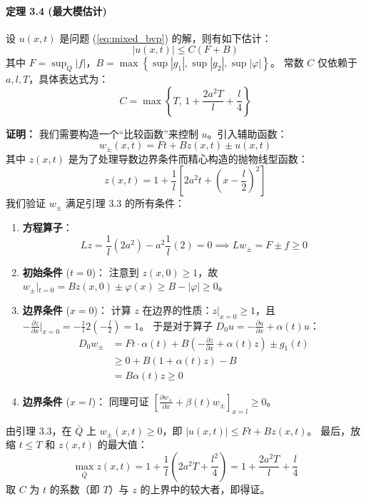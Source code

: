 \documentclass[12pt,a4paper]{ctexart}
\begin{document}
	\paragraph{定理 3.4 (最大模估计)}
	设 $u(x,t)$ 是问题 (\ref{eq:mixed_bvp}) 的解，则有如下估计：
	\begin{equation}
		|u(x,t)| \leqslant C(F + B)
	\end{equation}
	其中 $F = \sup_Q |f|$，$B = \max \left\{ \sup|g_1|, \sup|g_2|, \sup|\varphi| \right\}$。
	常数 $C$ 仅依赖于 $a, l, T$，具体表达式为：
	\[
	C = \max \left\{ T, \, 1 + \frac{2a^2 T}{l} + \frac{l}{4} \right\}
	\]
	
	\textbf{证明：}
	我们需要构造一个“比较函数”来控制 $u$。引入辅助函数：
	\[
	w_{\pm}(x,t) = F t + B z(x,t) \pm u(x,t)
	\]
	其中 $z(x,t)$ 是为了处理导数边界条件而精心构造的抛物线型函数：
	\[
	z(x,t) = 1 + \frac{1}{l} \left[ 2a^2 t + \left( x - \frac{l}{2} \right)^2 \right]
	\]
	我们验证 $w_{\pm}$ 满足引理 3.3 的所有条件：
	\begin{enumerate}
		\item \textbf{方程算子}：
		\[
		L z = \frac{1}{l}(2a^2) - a^2 \frac{1}{l}(2) = 0 \implies L w_{\pm} = F \pm f \geqslant 0
		\]
		\item \textbf{初始条件} ($t=0$)：
		注意到 $z(x,0) \geqslant 1$，故 $w_{\pm}|_{t=0} = B z(x,0) \pm \varphi(x) \geqslant B - |\varphi| \geqslant 0$。
		\item \textbf{边界条件} ($x=0$)：
		计算 $z$ 在边界的性质：$z|_{x=0} \geqslant 1$，且 $-\frac{\partial z}{\partial x}|_{x=0} = -\frac{1}{l} 2(-\frac{l}{2}) = 1$。
		于是对于算子 $D_0 u = -\frac{\partial u}{\partial x} + \alpha(t)u$：
		\begin{align*}
			D_0 w_{\pm} &= F t \cdot \alpha(t) + B \left( -\frac{\partial z}{\partial x} + \alpha(t) z \right) \pm g_1(t) \\
			&\geqslant 0 + B(1 + \alpha(t) z) - B \\
			&= B \alpha(t) z \geqslant 0
		\end{align*}
		\item \textbf{边界条件} ($x=l$)：
		同理可证 $\left[ \frac{\partial w_{\pm}}{\partial x} + \beta(t) w_{\pm} \right]_{x=l} \geqslant 0$。
	\end{enumerate}
	由引理 3.3，在 $\bar{Q}$ 上 $w_{\pm}(x,t) \geqslant 0$，即 $|u(x,t)| \leqslant F t + B z(x,t)$。
	最后，放缩 $t \leqslant T$ 和 $z(x,t)$ 的最大值：
	\[
	\max_{\bar{Q}} z(x,t) = 1 + \frac{1}{l} \left( 2a^2 T + \frac{l^2}{4} \right) = 1 + \frac{2a^2 T}{l} + \frac{l}{4}
	\]
	取 $C$ 为 $t$ 的系数（即 $T$）与 $z$ 的上界中的较大者，即得证。
	
\end{document}
